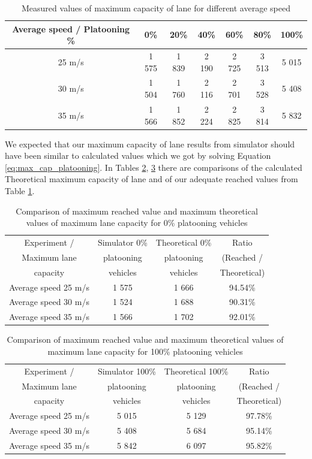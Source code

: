 \begin{table}[ph]
\begin{centering}
\begin{tabular}{|c|c|c|c|c|c|c|}
\hline 
Average speed / Platooning \% &	0\% &	20\% &	40\% &	60\% &	80\% &	100\%\tabularnewline
\hline 
25 m/s &	1 575 &	1 839 &	2 190 &	2 725 &	3 513 &	5 015\tabularnewline
\hline 
30 m/s &	1 504 &	1 760 &	2 116 &	2 701 &	3 528 &	5 408\tabularnewline
\hline 
35 m/s &	1 566 &	1 852  & 2 224 &	2 825 &	3 814 &	5 832\tabularnewline
\hline 
\end{tabular}
\centering
\protect\caption{\label{tab:5_1-1}Measured values of maximum capacity of lane for different average speed}
\end{centering}
\end{table}

We expected that our maximum capacity of lane results from simulator should have been similar to calculated values which we got by solving Equation \ref{eq:max_cap_platooning}. In Tables \ref{tab:5_1-2}, \ref{tab:5_1-3} there are comparisons of the calculated Theoretical maximum capacity of lane and of our adequate reached values from Table \ref{tab:5_1-1}. 

\begin{table}[ht]
\begin{centering}
\begin{tabular}{|c|c|c|c|}
\hline 
Experiment / & 	Simulator 0\%  & 	Theoretical 0\%   &	Ratio  \tabularnewline
 Maximum lane & 	 platooning & 	  platooning  &	 (Reached / \tabularnewline
 capacity& 	  vehicles & vehicles & Theoretical)\tabularnewline
\hline 
Average speed 25 m/s &	1 575 &	1 666 &	94.54\%\tabularnewline
\hline 
Average speed 30 m/s &	1 524 &	1 688 &	90.31\%\tabularnewline
\hline 
Average speed 35 m/s &	1 566 &	1 702 &	92.01\%\tabularnewline
\hline 
\end{tabular}
\centering
\protect\caption{\label{tab:5_1-2}Comparison of maximum reached value and maximum theoretical values of maximum lane capacity for 0\% platooning vehicles}
\end{centering}
\end{table}

\begin{table}[ht]
\begin{centering}
\begin{tabular}{|c|c|c|c|}
\hline 
Experiment /  & Simulator 100\% & 	Theoretical 100\%   &	Ratio \tabularnewline
 Maximum lane &  platooning  & 	 platooning  &	 (Reached / \tabularnewline
 capacity& vehicles & 	 vehicles &	 Theoretical)\tabularnewline
\hline 
Average speed 25 m/s & 5 015 &	5 129 &	97.78\%\tabularnewline
\hline 
Average speed 30 m/s & 	5 408 &	5 684 &	95.14\%\tabularnewline
\hline 
Average speed 35 m/s&	5 842 &	6 097 &	95.82\%\tabularnewline
\hline 
\end{tabular}
\centering
\protect\caption{\label{tab:5_1-3}Comparison of maximum reached value and maximum theoretical values of maximum lane capacity for 100\% platooning vehicles}
\end{centering}
\end{table}

